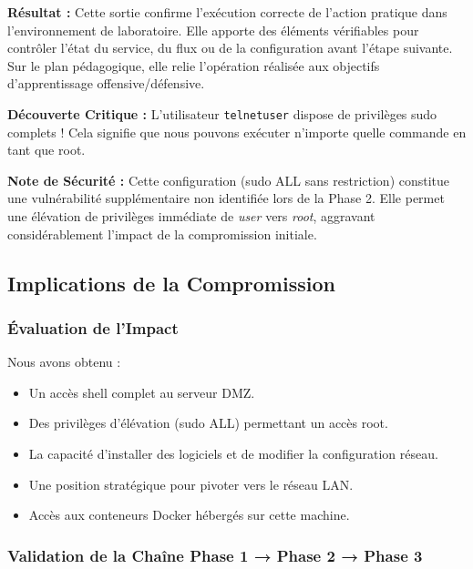 \documentclass[12pt,a4paper,openany]{report}
\begin{document}
	\textbf{Résultat :} Cette sortie confirme l'exécution correcte de l'action pratique dans l'environnement de laboratoire. Elle apporte des éléments vérifiables pour contrôler l'état du service, du flux ou de la configuration avant l'étape suivante. Sur le plan pédagogique, elle relie l'opération réalisée aux objectifs d'apprentissage offensive/défensive.
	
	
	\textbf{Découverte Critique :} L'utilisateur \texttt{telnetuser} dispose de privilèges sudo complets ! Cela signifie que nous pouvons exécuter n'importe quelle commande en tant que root.
	
	\textbf{Note de Sécurité :} Cette configuration (sudo ALL sans restriction) constitue une vulnérabilité supplémentaire non identifiée lors de la Phase 2. Elle permet une élévation de privilèges immédiate de \textit{user} vers \textit{root}, aggravant considérablement l'impact de la compromission initiale.
	
	\subsection{Implications de la Compromission}
	
	\subsubsection{Évaluation de l'Impact}
	
	Nous avons obtenu :
	\begin{itemize}
		\item \textcolor{green}{\checkmark} Un accès shell complet au serveur DMZ.
		\item \textcolor{green}{\checkmark} Des privilèges d'élévation (sudo ALL) permettant un accès root.
		\item \textcolor{green}{\checkmark} La capacité d'installer des logiciels et de modifier la configuration réseau.
		\item \textcolor{green}{\checkmark} Une position stratégique pour pivoter vers le réseau LAN.
		\item \textcolor{green}{\checkmark} Accès aux conteneurs Docker hébergés sur cette machine.
	\end{itemize}
	
	\subsubsection{Validation de la Chaîne Phase 1 → Phase 2 → Phase 3}
	
\end{document}
